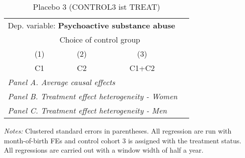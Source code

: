  \begin{table}[H] \centering \begin{threeparttable} \caption{Placebo 3 (CONTROL3 ist TREAT) } {\def\sym#1{\ifmmode^{#1}\else\(^{#1}\)\fi} \begin{tabular}{l*{4}{c}} \toprule \multicolumn{4}{l}{Dep. variable: \textbf{Psychoactive substance abuse}} \\ & \multicolumn{3}{c}{Choice of control group} \\ \cmidrule(lr){2-4}
            &\multicolumn{1}{c}{(1)}&\multicolumn{1}{c}{(2)}&\multicolumn{1}{c}{(3)}\\
            &\multicolumn{1}{c}{C1}&\multicolumn{1}{c}{C2}&\multicolumn{1}{c}{C1+C2}\\
\midrule
 \multicolumn{4}{l}{\emph{Panel A. Average causal effects}} \\      \midrule\multicolumn{4}{l}{\emph{Panel B. Treatment effect heterogeneity - Women}} \\      \midrule\multicolumn{4}{l}{\emph{Panel C. Treatment effect heterogeneity - Men}} \\      
\bottomrule \end{tabular} } \begin{tablenotes} \item \scriptsize \emph{Notes:} Clustered standard errors in parentheses. All regression are run with month-of-birth FEs and control cohort 3 is assigned with the treatment status. All regressions are carried out with a window width of half a year. \end{tablenotes} \end{threeparttable} \end{table} 
